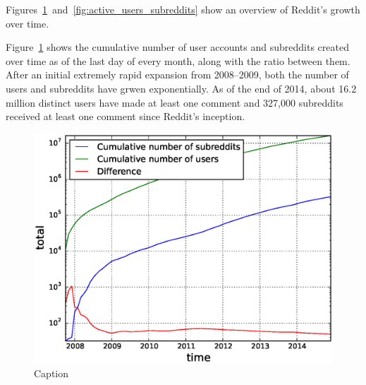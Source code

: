 Figures~\ref{fig:cumulative_users_subreddits}~and~\ref{fig:active_users_subreddits} show an overview of Reddit's growth over time.  

Figure~\ref{fig:cumulative_users_subreddits} shows the cumulative number of user accounts and subreddits created over time as of the last day of every month, along with the ratio between them.  After an initial extremely rapid expansion from 2008--2009, both the number of users and subreddits have grwen exponentially.  As of the end of 2014, about 16.2 million distinct users have made at least one comment and 327,000 subreddits received at least one comment since Reddit's inception.


\begin{figure}[!tb]
\centering
\includegraphics[scale=0.4]{./images/cumulative_users_subreddits.eps}
\caption{Caption}
\label{fig:cumulative_users_subreddits}
\end{figure}

